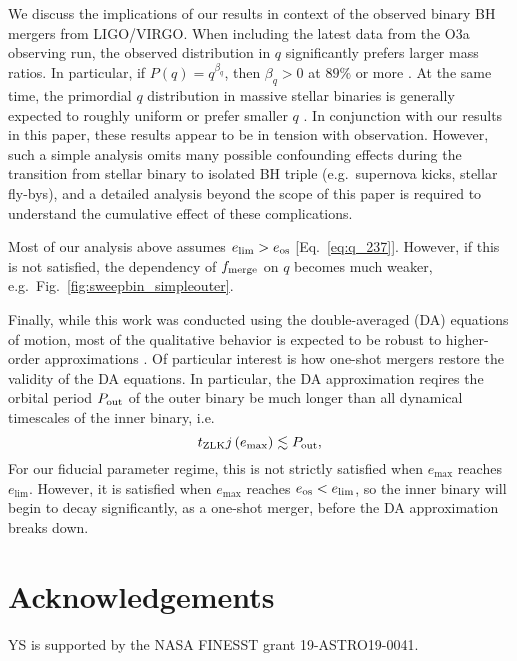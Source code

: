 \documentclass[
        fleqn,
        usenatbib,
    ]{mnras}
\newcommand*{\p}[1]{\left(#1\right)}
\begin{document}
We discuss the implications of our results in context of the observed binary BH
mergers from LIGO/VIRGO\@. When including the latest data from the O3a observing
run, the observed distribution in $q$ significantly prefers larger mass ratios.
In particular, if $P(q) = q^{\beta_q}$, then $\beta_q > 0$ at $89\%$ or more
\citep{LIGOO3a}. At the same time, the primordial $q$ distribution in massive
stellar binaries is generally expected to roughly uniform or prefer smaller $q$
\citep[e.g.][]{sana2012binary, moe2017mind}. In conjunction with our results in
this paper, these results appear to be in tension with observation. However,
such a simple analysis omits many possible confounding effects during the
transition from stellar binary to isolated BH triple (e.g.\ supernova kicks,
stellar fly-bys), and a detailed analysis beyond the scope of this paper is
required to understand the cumulative effect of these complications.

Most of our analysis above assumes $e_{\lim} > e_{\rm os}$
[Eq.~\eqref{eq:q_237}]. However, if this is not satisfied, the dependency of
$f_{\rm merge}$ on $q$ becomes much weaker, e.g.\
Fig.~\ref{fig:sweepbin_simpleouter}.

Finally, while this work was conducted using the double-averaged (DA) equations
of motion, most of the qualitative behavior is expected to be robust to
higher-order approximations \citep[e.g.][]{LL19}. Of particular interest is how
one-shot mergers restore the validity of the DA equations. In particular, the DA
approximation reqires the orbital period $P_{\rm out}$ of the outer binary be
much longer than all dynamical timescales of the inner binary, i.e.
\begin{equation}
    t_{\rm ZLK}j\p{e_{\max}} \lesssim P_{\rm out},
\end{equation}
For our fiducial parameter regime, this is not strictly satisfied when
$e_{\max}$ reaches $e_{\lim}$. However, it is satisfied when $e_{\max}$ reaches
$e_{\rm os} < e_{\lim}$, so the inner binary will begin to decay significantly,
as a one-shot merger, before the DA approximation breaks down.

\section{Acknowledgements}\label{s:ack}

YS is supported by the NASA FINESST grant 19-ASTRO19-0041.%



\end{document}
